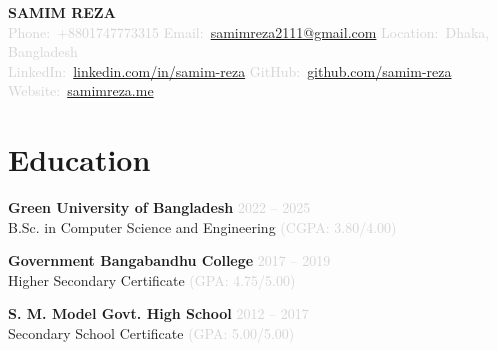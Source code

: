 \documentclass[letterpaper,11pt]{extarticle}
\newcommand{\faPhone}{Phone:}
\newcommand{\faEnvelope}{Email:}
\newcommand{\faMapMarker}{Location:}
\newcommand{\faLinkedin}{LinkedIn:}
\newcommand{\faGithub}{GitHub:}
\newcommand{\faGlobe}{Website:}
\begin{document}
\begin{center}
    {\Huge \scshape \textbf{SAMIM REZA}} \\[4pt]
    \textcolor{lightgray}{
        \faPhone\ +8801747773315 \quad
        \faEnvelope\ \href{mailto:samimreza2111@gmail.com}{samimreza2111@gmail.com} \quad
        \faMapMarker\ Dhaka, Bangladesh \\[2pt]
        \faLinkedin\ \href{https://linkedin.com/in/samim-reza}{linkedin.com/in/samim-reza} \quad
        \faGithub\ \href{https://github.com/samim-reza}{github.com/samim-reza} \quad
        \faGlobe\ \href{https://samimreza.me}{samimreza.me}}
\end{center}

\section{Education}

\vspace{0.2cm}

\textbf{Green University of Bangladesh} \hfill \textcolor{lightgray}{2022 -- 2025}\\
B.Sc. in Computer Science and Engineering \textcolor{lightgray}{(CGPA: 3.80/4.00)}

\vspace{0.2cm}
\textbf{Government Bangabandhu College} \hfill \textcolor{lightgray}{2017 -- 2019}\\
Higher Secondary Certificate \textcolor{lightgray}{(GPA: 4.75/5.00)}

\vspace{0.2cm}
\textbf{S. M. Model Govt. High School} \hfill \textcolor{lightgray}{2012 -- 2017}\\
Secondary School Certificate \textcolor{lightgray}{(GPA: 5.00/5.00)}

\end{document}
